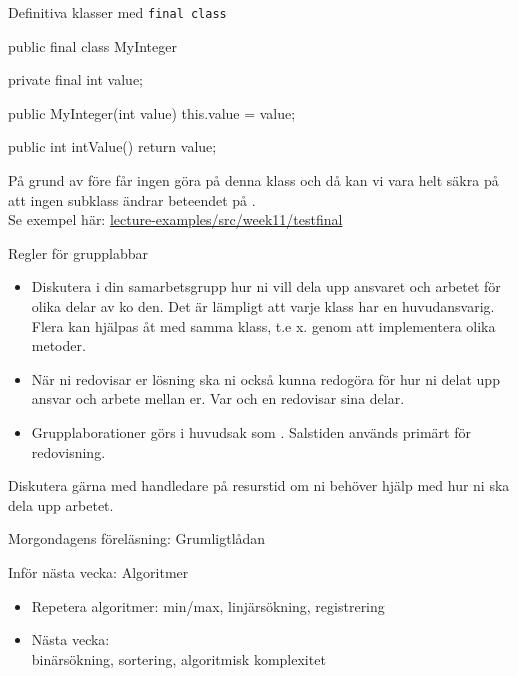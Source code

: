 \documentclass{lecturenotes}
\begin{document}
\begin{Slide}{Definitiva klasser med \texttt{final class}}
\begin{Code}
public final class MyInteger {
    private final int value;

    public MyInteger(int value) {
        this.value = value;
    }
    
    public int intValue() {
        return value;
    }
}
\end{Code}
På grund av  före  får ingen göra  på denna klass och då kan vi vara helt säkra på att ingen subklass ändrar beteendet på . \\
Se exempel här: \href{https://github.com/bjornregnell/lth-eda016-2015/tree/master/lectures/examples/eclipse-ws/lecture-examples/src/week11/testfinal}{lecture-examples/src/week11/testfinal}
\end{Slide}


\begin{Slide}{Regler för grupplabbar}
\begin{itemize}
\item Diskutera i din samarbetsgrupp hur ni vill dela upp ansvaret och arbetet för olika delar av ko
den. Det är lämpligt att varje klass har en huvudansvarig. Flera kan hjälpas åt med samma klass, t.e
x. genom att implementera olika metoder.
\item När ni redovisar er lösning ska ni också kunna redogöra för hur ni delat upp ansvar och arbete
 mellan er. Var och en redovisar sina delar.
\item Grupplaborationer görs i huvudsak som . Salstiden används primärt för redovisning.
\end{itemize}
Diskutera gärna med handledare på resurstid om ni behöver hjälp med hur ni ska dela upp arbetet.
\end{Slide}

\begin{Slide}{Morgondagens föreläsning: Grumligtlådan}
\end{Slide}

\begin{Slide}{Inför nästa vecka: Algoritmer}
\begin{itemize}
\item Repetera algoritmer: min/max, linjärsökning, registrering
\item Nästa vecka: \\ binärsökning, sortering, algoritmisk komplexitet
\end{itemize}
\end{Slide}
\end{document}
